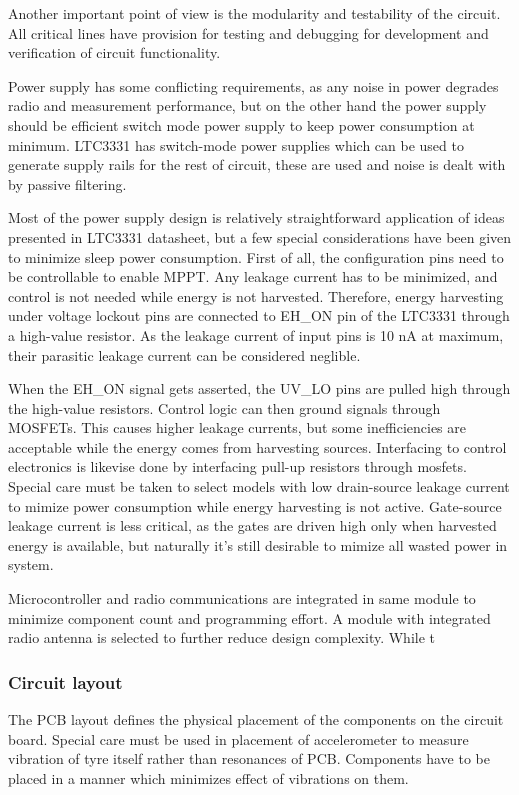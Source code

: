 Another important point of view is the modularity and testability of the circuit. All critical lines have provision for testing and debugging for development and verification of circuit functionality. 

Power supply has some conflicting requirements, as any noise in power degrades radio and measurement performance, but on the other hand the power supply should be efficient switch mode power supply to keep power consumption at minimum. LTC3331 has switch-mode power supplies which can be used to generate supply rails for the rest of circuit, these are used and noise is dealt with by passive filtering.

Most of the power supply design is relatively straightforward application of ideas presented in LTC3331 datasheet, but a few special considerations have been given to minimize sleep power consumption. First of all, the configuration pins need to be controllable to enable MPPT. Any leakage current has to be minimized, and control is not needed while energy is not harvested. Therefore, energy harvesting under voltage lockout pins are connected to EH\_ON pin of the LTC3331 through a high-value resistor. As the leakage current of input pins is 10 nA at maximum, their parasitic leakage current can be considered neglible. 

When the EH\_ON signal gets asserted, the UV\_LO pins are pulled high through the high-value resistors. Control logic can then ground signals through MOSFETs. This causes higher leakage currents, but some inefficiencies are acceptable while the energy comes from harvesting sources. Interfacing to control electronics is likevise done by interfacing pull-up resistors through mosfets. Special care must be taken to select models with low drain-source leakage current to mimize power consumption while energy harvesting is not active. Gate-source leakage current is less critical, as the gates are driven high only when harvested energy is available, but naturally it's still desirable to mimize all wasted power in system.

Microcontroller and radio communications are integrated in same module to minimize component count and programming effort. A module with integrated radio antenna is selected to further reduce design complexity. While t


\subsubsection{Circuit layout}
The PCB layout defines the physical placement of the components on the circuit board. Special care must be used in placement of accelerometer to measure vibration of tyre itself rather than resonances of PCB. Components have to be placed in a manner which minimizes effect of vibrations on them. 




